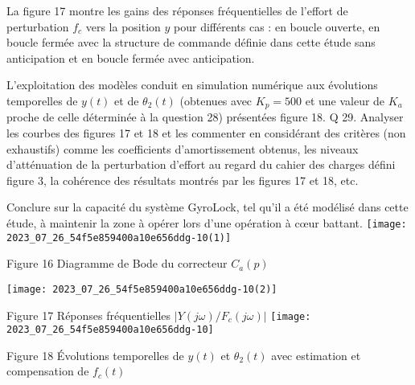 La figure 17 montre les gains des réponses fréquentielles de l'effort de perturbation $f_{c}$ vers la position $y$ pour différents cas : en boucle ouverte, en boucle fermée avec la structure de commande définie dans cette étude sans anticipation et en boucle fermée avec anticipation.

L'exploitation des modèles conduit en simulation numérique aux évolutions temporelles de $y(t)$ et de $\theta_{2}(t)$ (obtenues avec $K_{p}=500$ et une valeur de $K_{a}$ proche de celle déterminée à la question 28) présentées figure 18. Q 29. Analyser les courbes des figures 17 et 18 et les commenter en considérant des critères (non exhaustifs) comme les coefficients d'amortissement obtenus, les niveaux d'atténuation de la perturbation d'effort au regard du cahier des charges défini figure 3, la cohérence des résultats montrés par les figures 17 et 18, etc.

Conclure sur la capacité du système GyroLock, tel qu'il a été modélisé dans cette étude, à maintenir la zone à opérer lors d'une opération à cœur battant.
\texttt{[image: 2023\_07\_26\_54f5e859400a10e656ddg-10(1)]}

Figure 16 Diagramme de Bode du correcteur $C_{a}(p)$

\begin{center}
\texttt{[image: 2023\_07\_26\_54f5e859400a10e656ddg-10(2)]}
\end{center}

Figure 17 Réponses fréquentielles $\left|Y(j \omega) / F_{c}(j \omega)\right|$
\texttt{[image: 2023\_07\_26\_54f5e859400a10e656ddg-10]}

Figure 18 Évolutions temporelles de $y(t)$ et $\theta_{2}(t)$ avec estimation et compensation de $f_{c}(t)$


%